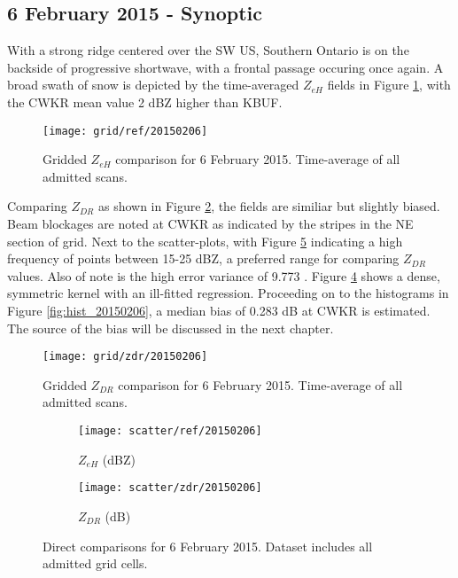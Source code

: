 \subsection{6 February 2015 - Synoptic}
With a strong ridge centered over the SW US, Southern Ontario is on the backside of progressive shortwave, with a frontal passage occuring once again. A
broad swath of snow is depicted by the time-averaged $Z_{eH}$ fields in Figure \ref{fig:grid_ref_20150206}, with the CWKR mean value 2 dBZ higher than KBUF.
\begin{figure}[H]
\texttt{[image: grid/ref/20150206]}
\caption{Gridded $Z_{eH}$ comparison for 6 February 2015. Time-average of all admitted scans.} 
\label{fig:grid_ref_20150206}
\end{figure}
Comparing $Z_{DR}$ as shown in Figure \ref{fig:grid_zdr_20150206}, the fields are similiar but slightly biased. Beam blockages are noted at CWKR as indicated
by the stripes in the NE section of grid. Next to the scatter-plots, with Figure \ref{fig:scatter_20150206} indicating a high
frequency of points between 15-25 dBZ, a preferred range for comparing $Z_{DR}$ values. Also of note is the high error variance of 9.773 .
Figure \ref{fig:scatter_zdr_20150206} shows a dense, symmetric kernel with an ill-fitted regression. Proceeding on to the histograms in Figure
\ref{fig:hist_20150206}, a median bias of 0.283 dB at CWKR is estimated. The source of the bias will be discussed in the next chapter. 

\begin{figure}[p]
\texttt{[image: grid/zdr/20150206]}
\caption{Gridded $Z_{DR}$ comparison for 6 February 2015. Time-average of all admitted scans.} 
\label{fig:grid_zdr_20150206}
\end{figure}

\begin{figure}[p]
\centering
   \begin{subfigure}{0.49\linewidth} \centering
     \texttt{[image: scatter/ref/20150206]}
     \caption{$Z_{eH}$ (dBZ)}\label{fig:scatter_ref_20150206}
   \end{subfigure}
   \begin{subfigure}{0.49\linewidth} \centering
     \texttt{[image: scatter/zdr/20150206]}
     \caption{$Z_{DR}$ (dB)}\label{fig:scatter_zdr_20150206}
   \end{subfigure}
\caption{Direct comparisons for 6 February 2015. Dataset includes all admitted grid cells.} \label{fig:scatter_20150206}
\end{figure}

